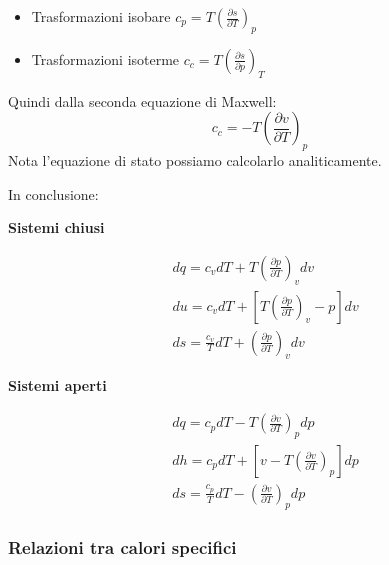 \documentclass[a4paper]{article}
\numberwithin{equation}{section}%
\begin{document}
\begin{itemize}
	\item Trasformazioni isobare $c_{p}=T\left(\frac{\partial s}{\partial T}\right)_{p}$
	\item Trasformazioni isoterme $c_{c}=T\left(\frac{\partial s}{\partial p}\right)_{T}$
\end{itemize}

Quindi dalla seconda equazione di Maxwell: 
\begin{equation}
c_{c}=-T\left(\frac{\partial v}{\partial T}\right)_{p}
\end{equation}
Nota l'equazione di stato possiamo calcolarlo analiticamente. 
\newline

In conclusione: 

\begin{multicols}{2}
	\begin{center}
\textbf{Sistemi chiusi}
	\end{center}

\begin{equation}
\begin{aligned}
	&d q=c_{v} d T+T\left(\frac{\partial p}{\partial T}\right)_{v} d v \\
	&d u=c_{v} d T+\left[T\left(\frac{\partial p}{\partial T}\right)_{v}-p\right] d v \\
	&d s=\frac{c_{v}}{T} d T+\left(\frac{\partial p}{\partial T}\right)_{v} d v
\end{aligned}
	\label{eq:sistemi_chiusi_coefficienti}
\end{equation}


\begin{center}
\textbf{Sistemi aperti}
\end{center}
\begin{equation}
\begin{aligned}
	&d q=c_{p} d T-T\left(\frac{\partial v}{\partial T}\right)_{p} d p \\
	&d h=c_{p} d T+\left[v-T\left(\frac{\partial v}{\partial T}\right)_{p}\right] d p \\
	&d s=\frac{c_{p}}{T} d T-\left(\frac{\partial v}{\partial T}\right)_{p} d p 
\end{aligned}
\label{eq:sistemi_aperti_coefficienti}
\end{equation}




\end{multicols}

\subsubsection{Relazioni tra calori specifici}\label{relazioni_cv_cp}
\end{document}
